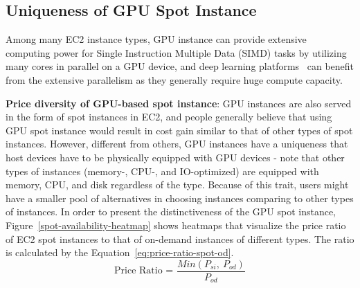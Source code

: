 \documentclass[conference]{IEEEtran}
\begin{document}
\subsection{Uniqueness of GPU Spot Instance}
Among many EC2 instance types, GPU instance can provide extensive computing power for Single Instruction Multiple Data (SIMD) tasks by utilizing many cores in parallel on a GPU device, and deep learning platforms~\cite{tensorflow,caffe,theano} can benefit from the extensive parallelism as they generally require huge compute capacity.

\textbf{Price diversity of GPU-based spot instance}: GPU instances are also served in the form of spot instances in EC2, and people generally believe that using GPU spot instance would result in cost gain similar to that of other types of spot instances. However, different from others, GPU instances have a uniqueness that host devices have to be physically equipped with GPU devices - note that other types of instances (memory-, CPU-, and IO-optimized) are equipped with memory, CPU, and disk regardless of the type. Because of this trait, users might have a smaller pool of alternatives in choosing instances comparing to other types of instances. In order to present the distinctiveness of the GPU spot instance, Figure~\ref{spot-availability-heatmap} shows heatmaps that visualize the price ratio of EC2 spot instances to that of on-demand instances of different types. The ratio is calculated by the Equation~\ref{eq:price-ratio-spot-od}.
\begin{equation}\label{eq:price-ratio-spot-od}
  \text{Price Ratio = }\dfrac{Min(P_{si},~P_{od})}{P_{od}}
\end{equation}
\end{document}
